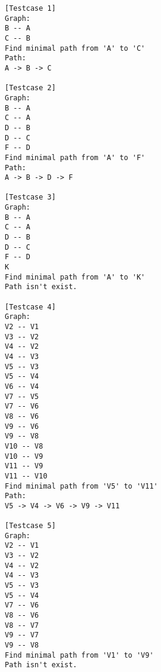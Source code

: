 \begin{framed}
\begin{verbatim}
[Testcase 1]
Graph:
B -- A
C -- B
Find minimal path from 'A' to 'C'
Path:
A -> B -> C

[Testcase 2]
Graph:
B -- A
C -- A
D -- B
D -- C
F -- D
Find minimal path from 'A' to 'F'
Path:
A -> B -> D -> F

[Testcase 3]
Graph:
B -- A
C -- A
D -- B
D -- C
F -- D
K
Find minimal path from 'A' to 'K'
Path isn't exist.

[Testcase 4]
Graph:
V2 -- V1
V3 -- V2
V4 -- V2
V4 -- V3
V5 -- V3
V5 -- V4
V6 -- V4
V7 -- V5
V7 -- V6
V8 -- V6
V9 -- V6
V9 -- V8
V10 -- V8
V10 -- V9
V11 -- V9
V11 -- V10
Find minimal path from 'V5' to 'V11'
Path:
V5 -> V4 -> V6 -> V9 -> V11

[Testcase 5]
Graph:
V2 -- V1
V3 -- V2
V4 -- V2
V4 -- V3
V5 -- V3
V5 -- V4
V7 -- V6
V8 -- V6
V8 -- V7
V9 -- V7
V9 -- V8
Find minimal path from 'V1' to 'V9'
Path isn't exist.
\end{verbatim}
\end{framed}

